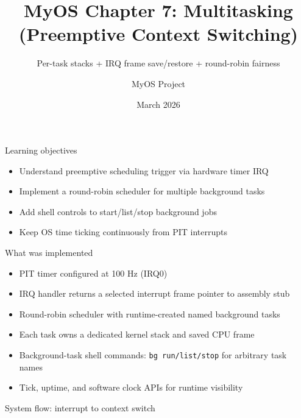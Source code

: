 \documentclass[aspectratio=169]{beamer}
\title[MyOS Chapter 7]{\textbf{MyOS Chapter 7: Multitasking (Preemptive Context Switching)}}
\subtitle{Per-task stacks + IRQ frame save/restore + round-robin fairness}
\author{MyOS Project}
\date{March 2026}
\institute{x86 Protected Mode Kernel Engineering}
\begin{document}
\begin{frame}
  \titlepage
\end{frame}

\begin{frame}{Learning objectives}
  \begin{itemize}
    \item Understand preemptive scheduling trigger via hardware timer IRQ
    \item Implement a round-robin scheduler for multiple background tasks
    \item Add shell controls to start/list/stop background jobs
    \item Keep OS time ticking continuously from PIT interrupts
  \end{itemize}
\end{frame}

\begin{frame}{What was implemented}
  \begin{itemize}
    \item PIT timer configured at 100 Hz (IRQ0)
    \item IRQ handler returns a selected interrupt frame pointer to assembly stub
    \item Round-robin scheduler with runtime-created named background tasks
    \item Each task owns a dedicated kernel stack and saved CPU frame
    \item Background-task shell commands: \texttt{bg run/list/stop} for arbitrary task names
    \item Tick, uptime, and software clock APIs for runtime visibility
  \end{itemize}
\end{frame}

\begin{frame}{System flow: interrupt to context switch}
\begin{center}
\end{center}
\end{frame}
\end{document}

